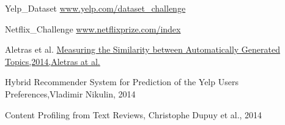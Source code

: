 \documentclass[11pt]{article}
\begin{document}




\begin{thebibliography}{}
	
	
	Yelp\_Dataset
	\newblock \href{www.yelp.com/dataset_challenge}{www.yelp.com/dataset\_challenge}
	
	Netflix\_Challenge
	\newblock \href{www.netflixprize.com/index}{www.netflixprize.com/index}
	
Aletras et al.
	\newblock \href{http://www.aclweb.org/anthology/E14-4#page=42}{Measuring the Similarity between Automatically Generated Topics,2014,Aletras at al.}
	

		\newblock Hybrid Recommender System for Prediction of the Yelp Users Preferences,Vladimir Nikulin, 2014


\newblock Content Profiling from Text Reviews,
\newblock Christophe Dupuy et al., 2014



\end{thebibliography}
\end{document}
